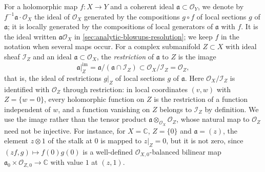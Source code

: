 For a holomorphic map $f\colon X\to Y$ and a coherent ideal $\mathfrak a\subset\mathcal O_Y$, we denote by $f^{-1}\mathfrak a\cdot\mathcal O_X$ the ideal of $\mathcal O_X$ generated by the compositions $g\circ f$ of local sections $g$ of $\mathfrak a$; it is locally generated by the compositions of local generators of $\mathfrak a$ with $f$. It is the ideal written $\mathfrak a\mathcal O_X$ in \cref{sec:analytic-blowups-resolution}; we keep $f$ in the notation when several maps occur. For a complex submanifold $Z\subset X$ with ideal sheaf $\mathcal I_Z$ and an ideal $\mathfrak a\subset\mathcal O_X$, the \emph{restriction} of $\mathfrak a$ to $Z$ is the image
\[
 \mathfrak a|_Z^{\mathrm{im}}
 =\mathfrak a/(\mathfrak a\cap\mathcal I_Z)\subset\mathcal O_X/\mathcal I_Z=\mathcal O_Z,
\]
that is, the ideal of restrictions $g|_Z$ of local sections $g$ of $\mathfrak a$. Here $\mathcal O_X/\mathcal I_Z$ is identified with $\mathcal O_Z$ through restriction: in local coordinates $(v,w)$ with $Z=\{w=0\}$, every holomorphic function on $Z$ is the restriction of a function independent of $w$, and a function vanishing on $Z$ belongs to $\mathcal I_Z$ by definition. We use the image rather than the tensor product $\mathfrak a\otimes_{\mathcal O_X}\mathcal O_Z$, whose natural map to $\mathcal O_Z$ need not be injective. For instance, for $X=\mathbb C$, $Z=\{0\}$ and $\mathfrak a=(z)$, the element $z\otimes1$ of the stalk at $0$ is mapped to $z|_Z=0$, but it is not zero, since $(zf,g)\mapsto f(0)g(0)$ is a well-defined $\mathcal O_{X,0}$-balanced bilinear map $\mathfrak a_0\times\mathcal O_{Z,0}\to\mathbb C$ with value $1$ at $(z,1)$.

